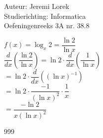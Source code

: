 \documentclass[a4paper]{article}
\begin{document}
  
\noindent \large Auteur: Jeremi Lorek\\
\noindent \large Studierichting: Informatica\\
\noindent \large Oefeningenreeks 3A nr. 38.8\\

\medskip
\normalsize


$f(x) = \log_x 2 = \dfrac{\ln 2}{\ln x}$  \\

$\dfrac{d}{dx} \left( \dfrac{\ln 2}{\ln x} \right) = \ln 2 \cdot \dfrac{d}{dx} \left( \dfrac{1}{\ln x} \right)$  \\

$= \ln 2 \cdot \dfrac{d}{dx} \left( (\ln x)^{-1} \right)$  \\

$= \ln 2 \cdot \dfrac{-1}{(\ln x)^2} \cdot \dfrac{1}{x}$  \\

$= \dfrac{-\ln 2}{x (\ln x)^2}$  \\



\begin{thebibliography}{999}
\end{thebibliography}
\end{document}
